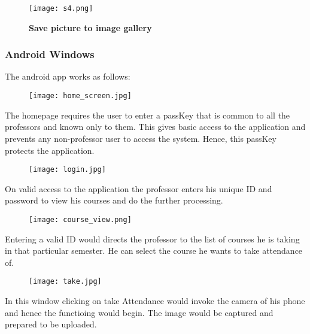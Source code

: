\documentclass{article}
\begin{document}
\begin{figure}[H]
\begin{center}
\texttt{[image: s4.png]}
\caption{\textbf{Save picture to image gallery}}
\label{Fig:diag3_4}
\end{center}
\end{figure}

\newpage
\subsubsection{Android Windows}
The android app works as follows:
   

\begin{figure}[H]
\begin{center}
\texttt{[image: home\_screen.jpg]}
\label{Fig:diag5_0}
\end{center}
\end{figure}
\begin{center}
{\large The homepage requires the user to enter a passKey that is common to all the professors and known only to them. This gives basic access to the application and prevents any non-professor user to access the system. Hence, this passKey protects the application.}
\end{center}

\begin{figure}[H]
\begin{center}
\texttt{[image: login.jpg]}
\label{Fig:diag5_1}
\end{center}
\end{figure}
\begin{center}
{\large On valid access to the application the professor enters his unique ID and password to view his courses and do the further processing.}
\end{center}

\begin{figure}[H]
\begin{center}
\texttt{[image: course\_view.png]}
\label{Fig:diag5_2}
\end{center}
\end{figure}
\begin{center}
{\large Entering a valid ID would directs the professor to the list of courses he is taking in that particular semester. He can select the course he wants to take attendance of.}
\end{center}


\begin{figure}[H]
\begin{center}
\texttt{[image: take.jpg]}
\label{Fig:diag5_3}
\end{center}
\end{figure}
\begin{center}
{\large In this window clicking on take Attendance would invoke the camera of his phone and hence the functioing would begin. The image would be captured and prepared to be uploaded.}
\end{center}
\end{document}
